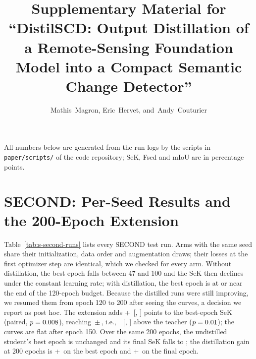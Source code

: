 \documentclass[journal,onecolumn,11pt]{IEEEtran}
\begin{document}
\title{Supplementary Material for ``DistilSCD: Output Distillation of a Remote-Sensing Foundation
Model into a Compact Semantic Change Detector''}
\author{Mathis~Magron, Eric~Hervet, and~Andy~Couturier}
\maketitle
\sloppy

All numbers below are generated from the run logs by the scripts in \texttt{paper/scripts/} of
the code repository; SeK, Fscd and mIoU are in percentage points.

\section{SECOND: Per-Seed Results and the 200-Epoch Extension}
Table~\ref{tab:s-second-runs} lists every SECOND test run. Arms with the same seed share their
initialization, data order and augmentation draws; their losses at the first optimizer step are
identical, which we checked for every arm. Without distillation, the best epoch falls between
47 and 100 and the SeK then declines under the constant learning rate; with distillation, the
best epoch is at or near the end of the 120-epoch budget. Because the distilled runs were still
improving, we resumed them from epoch 120 to 200 after seeing the curves, a decision we report
as post hoc. The extension adds +\ExtInc\ [\ExtIncLo, \ExtIncHi] points to the best-epoch SeK
(paired, $p=0.008$), reaching \SecFullTwoHundredSek\,$\pm$\,\SecFullTwoHundredSekSd, i.e.,\
\SecFullTwoHundredVsT\ [\SecFullTwoHundredVsTLo, \SecFullTwoHundredVsTHi] above the teacher
($p=0.01$); the curves are flat after epoch 150. Over the same 200 epochs, the
undistilled student's best epoch is unchanged and its final SeK falls to
\SecBaseSekFinalTwoHundred; the distillation gain at 200 epochs is +\SecFullTwoHundredGain\ on
the best epoch and +\SecFullTwoHundredGainFinal\ on the final epoch.


\end{document}
